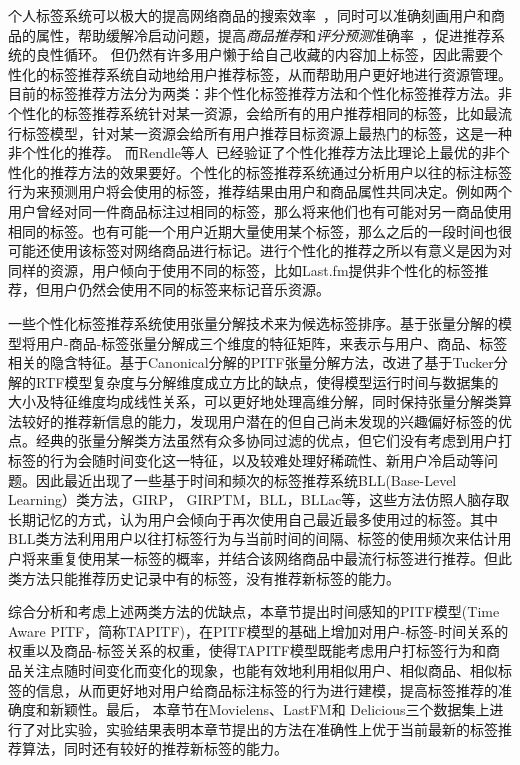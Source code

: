 个人标签系统可以极大的提高网络商品的搜索效率~\cite{jaschke2008tag}，同时可以准确刻画用户和商品的属性，帮助缓解冷启动问题\cite{lika2014facing}，提高\textit{商品推荐}和\textit{评分预测}准确率~\cite{tso2008tag,zhen2009tagicofi,lacic2014recommending,saha2015predicting}，促进推荐系统的良性循环。
但仍然有许多用户懒于给自己收藏的内容加上标签，因此需要个性化的标签推荐系统自动地给用户推荐标签，从而帮助用户更好地进行资源管理。目前的标签推荐方法分为两类：非个性化标签推荐方法和个性化标签推荐方法。非个性化的标签推荐系统针对某一资源，会给所有的用户推荐相同的标签，比如最流行标签模型，针对某一资源会给所有用户推荐目标资源上最热门的标签，这是一种非个性化的推荐。 而Rendle等人~\cite{rendle2009learning}已经验证了个性化推荐方法比理论上最优的非个性化的推荐方法的效果要好。个性化的标签推荐系统通过分析用户以往的标注标签行为来预测用户将会使用的标签，推荐结果由用户和商品属性共同决定。例如两个用户曾经对同一件商品标注过相同的标签，那么将来他们也有可能对另一商品使用相同的标签。也有可能一个用户近期大量使用某个标签，那么之后的一段时间也很可能还使用该标签对网络商品进行标记。进行个性化的推荐之所以有意义是因为对同样的资源，用户倾向于使用不同的标签，比如Last.fm提供非个性化的标签推荐，但用户仍然会使用不同的标签来标记音乐资源。

一些个性化标签推荐系统使用张量分解技术来为候选标签排序。基于张量分解的模型将用户-商品-标签张量分解成三个维度的特征矩阵，来表示与用户、商品、标签相关的隐含特征。基于Canonical分解的PITF\cite{rendle2010pairwise}张量分解方法，改进了基于Tucker分解的RTF\cite{rendle2009learning}模型复杂度与分解维度成立方比的缺点，使得模型运行时间与数据集的大小及特征维度均成线性关系，可以更好地处理高维分解，同时保持张量分解类算法较好的推荐新信息的能力，发现用户潜在的但自己尚未发现的兴趣偏好标签的优点。经典的张量分解类方法虽然有众多协同过滤的优点，但它们没有考虑到用户打标签的行为会随时间变化这一特征，以及较难处理好稀疏性、新用户冷启动等问题。因此最近出现了一些基于时间和频次的标签推荐系统BLL(Base-Level Learning）类方法，GIRP\cite{zhang2012integrating}， GIRPTM\cite{zhang2012integrating}，BLL\cite{anderson2004integrated}，BLLac\cite{kowald2015forgetting}等，这些方法仿照人脑存取长期记忆的方式，认为用户会倾向于再次使用自己最近最多使用过的标签。其中BLL类方法利用用户以往打标签行为与当前时间的间隔、标签的使用频次来估计用户将来重复使用某一标签的概率，并结合该网络商品中最流行标签进行推荐。但此类方法只能推荐历史记录中有的标签，没有推荐新标签的能力。

综合分析和考虑上述两类方法的优缺点，本章节提出时间感知的PITF模型(Time Aware PITF，简称TAPITF)，在PITF模型的基础上增加对用户-标签-时间关系的权重以及商品-标签关系的权重，使得TAPITF模型既能考虑用户打标签行为和商品关注点随时间变化而变化的现象，也能有效地利用相似用户、相似商品、相似标签的信息，从而更好地对用户给商品标注标签的行为进行建模，提高标签推荐的准确度和新颖性。最后， 本章节在Movielens、LastFM和 Delicious三个数据集上进行了对比实验，实验结果表明本章节提出的方法在准确性上优于当前最新的标签推荐算法，同时还有较好的推荐新标签的能力。

